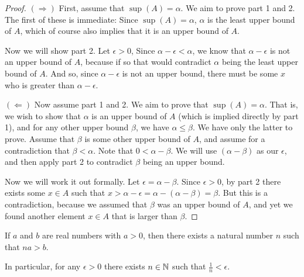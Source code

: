 \documentclass[11pt,twoside=off,numbers=noenddot]{scrbook}
\begin{document}
\begin{proof}
    \phantom{.}

    $(\Rightarrow)$ First, assume that $\sup(A) = \alpha$. We aim to prove part 1 and 2. The first of these is immediate: Since $\sup(A) = \alpha$, $\alpha$ is the least upper bound of $A$, which of course also implies that it is an upper bound of $A$.

    Now we will show part 2. Let $\epsilon > 0$, Since $\alpha - \epsilon < \alpha$, we know that $\alpha - \epsilon$ is not an upper bound of $A$, because if so that would contradict $\alpha$ being the least upper bound of $A$. And so, since $\alpha - \epsilon$ is not an upper bound, there must be some $x$ who is greater than $\alpha - \epsilon$.

    $(\Leftarrow)$ Now assume part 1 and 2. We aim to prove that $\sup(A) = \alpha$. That is, we wish to show that $\alpha$ is an upper bound of $A$ (which is implied directly by part 1), and for any other upper bound $\beta$, we have $\alpha \leq \beta$. We have only the latter to prove. Assume that $\beta$ is some other upper bound of $A$, and assume for a contradiction that $\beta < \alpha$. Note that $0 < \alpha - \beta$. We will use $(\alpha - \beta)$ as our $\epsilon$, and then apply part 2 to contradict $\beta$ being an upper bound. 

    Now we will work it out formally. Let $\epsilon = \alpha - \beta$. Since $\epsilon > 0$, by part 2 there exists some $x \in A$ such that $x > \alpha - \epsilon = \alpha - (\alpha - \beta) = \beta$. But this is a contradiction, because we assumed that $\beta$ was an upper bound of $A$, and yet we found another element $x \in A$ that is larger than $\beta$.
\end{proof}

\begin{lemma}
    If $a$ and $b$ are real numbers with $a > 0$, then there exists a natural number $n$ such that $na > b$.

    In particular, for any $\epsilon > 0$ there exists $n \in \mathbb N$ such that $\frac{1}{n} < \epsilon$.
\end{lemma}
\end{document}
